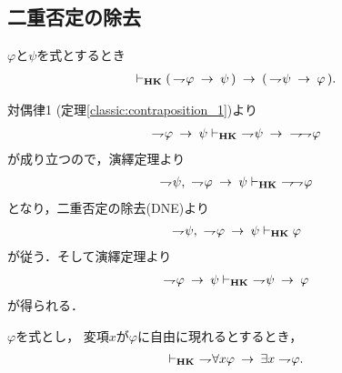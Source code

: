\subsection{二重否定の除去}
	\begin{screen}
		\begin{thm}[対偶律3]\label{classic:contraposition_3}
			$\varphi$と$\psi$を式とするとき
			\begin{align}
				\vdash_{{\scriptsize \mbox{{\bf HK}}}} (\, \rightharpoondown\hspace{-0.25em} \varphi \hspace{0.25em}\rightarrow\hspace{0.25em} \psi\, )
				\hspace{0.25em}\rightarrow\hspace{0.25em} (\, \rightharpoondown\hspace{-0.25em} \psi \hspace{0.25em}\rightarrow\hspace{0.25em} \varphi\, ).
			\end{align}
		\end{thm}
	\end{screen}
	
	\begin{sketch}
		対偶律1 (定理\ref{classic:contraposition_1})より
		\begin{align}
			\negation \varphi \rarrow \psi \provable{\mbox{{\bf HK}}}\ 
			\negation \psi \rarrow\ \negation \negation \varphi
		\end{align}
		が成り立つので，演繹定理より
		\begin{align}
			\rightharpoondown\hspace{-0.25em} \psi,\ \rightharpoondown\hspace{-0.25em} \varphi \hspace{0.25em}\rightarrow\hspace{0.25em} \psi 
			\vdash_{{\scriptsize \mbox{{\bf HK}}}}\ \rightharpoondown\hspace{-0.25em} \rightharpoondown\hspace{-0.25em} \varphi
		\end{align}
		となり，二重否定の除去(DNE)より
		\begin{align}
			\rightharpoondown\hspace{-0.25em} \psi,\ \rightharpoondown\hspace{-0.25em} \varphi \hspace{0.25em}\rightarrow\hspace{0.25em} \psi 
			\vdash_{{\scriptsize \mbox{{\bf HK}}}} \varphi
		\end{align}
		が従う．そして演繹定理より
		\begin{align}
			\rightharpoondown\hspace{-0.25em} \varphi \hspace{0.25em}\rightarrow\hspace{0.25em} \psi 
			\vdash_{{\scriptsize \mbox{{\bf HK}}}}\ \rightharpoondown\hspace{-0.25em} \psi \hspace{0.25em}\rightarrow\hspace{0.25em} \varphi
		\end{align}
		が得られる．
		\QED
	\end{sketch}
	
	\begin{screen}
		\begin{thm}
		\label{classic:strong_De_Morgan_law_for_quantifier_2}
			$\varphi$を式とし，
			変項$x$が$\varphi$に自由に現れるとするとき，
			\begin{align}
				\vdash_{{\scriptsize \mbox{{\bf HK}}}}\ \rightharpoondown\hspace{-0.25em} \forall x \varphi \hspace{0.25em}\rightarrow\hspace{0.25em} 
				\exists x \rightharpoondown\hspace{-0.25em} \varphi.
			\end{align}
		\end{thm}
	\end{screen}
	
